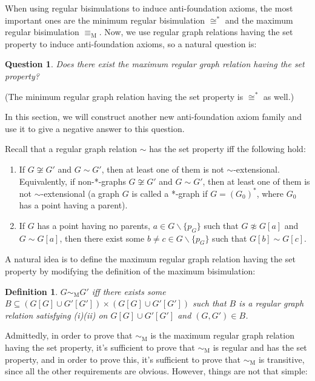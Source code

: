 \documentclass{amsart}
\newtheorem{definition}{Definition}
\newtheorem{question}{Question}
\begin{document}
When using regular bisimulations to induce anti-foundation axioms, the most important ones are the minimum regular bisimulation $\cong^*$ and the maximum regular bisimulation $\equiv_\mathrm{M}$. Now, we use regular graph relations having the set property to induce anti-foundation axioms, so a natural question is:

\begin{question}
    Does there exist the maximum regular graph relation having the set property?
\end{question}

(The minimum regular graph relation having the set property is $\cong^*$ as well.)

In this section, we will construct another new anti-foundation axiom family and use it to give a negative answer to this question.

Recall that a regular graph relation $\sim$ has the set property iff the following hold:

\begin{enumerate}[label=(\roman*)]
    \item If $G\not\cong G'$ and $G\sim G'$, then at least one of them is not $\sim$-extensional. Equivalently, if non-*-graphs $G\not\cong G'$ and $G\sim G'$, then at least one of them is not $\sim$-extensional (a graph $G$ is called a *-graph if $G=(G_0)^*$, where $G_0$ has a point having a parent).
    \item If $G$ has a point having no parents, $a\in G\backslash\{p_G\}$ such that $G\not\approx G[a]$ and $G\sim G[a]$, then there exist some $b \not= c \in G\backslash\{p_G\}$ such that $G[b] \sim G[c]$.
\end{enumerate}

A natural idea is to define the maximum regular graph relation having the set property by modifying the definition of the maximum bisimulation:

\begin{definition}
    $G\sim_\mathrm{M} G'$ iff there exists some $B\subseteq (G[G]\cup G'[G'])\times(G[G]\cup G'[G'])$ such that $B$ is a regular graph relation satisfying (i)(ii) on $G[G]\cup G'[G']$ and $(G,G')\in B$.
\end{definition}

Admittedly, in order to prove that $\sim_\mathrm{M}$ is the maximum regular graph relation having the set property, it's sufficient to prove that $\sim_\mathrm{M}$ is regular and has the set property, and in order to prove this, it's sufficient to prove that $\sim_\mathrm{M}$ is transitive, since all the other requirements are obvious. However, things are not that simple:
\end{document}
